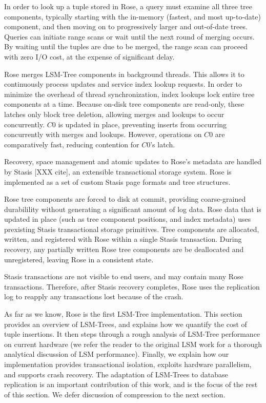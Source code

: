 \documentclass{vldb}
\newcommand{\rows}{Rose\xspace}
\newcommand{\rowss}{Rose's\xspace}
\begin{document}
In order to look up a tuple stored in \rows, a query must examine all
three tree components, typically starting with the in-memory (fastest, and most
up-to-date) component, and then moving on to progressively larger and
out-of-date trees.  Queries can initiate range scans or wait until the next round
of merging occurs.  By waiting until the tuples are due to be merged, the
range scan can proceed with zero I/O cost, at the expense of significant
delay.

\rows merges LSM-Tree components in background threads.  This allows
it to continuously process updates and service index lookup requests.
In order to minimize the overhead of thread synchronization, index
lookups lock entire tree components at a time.  Because on-disk tree
components are read-only, these latches only block tree deletion,
allowing merges and lookups to occur concurrently.  $C0$ is
updated in place, preventing inserts from occurring concurrently with
merges and lookups.  However, operations on $C0$ are comparatively
fast, reducing contention for $C0$'s latch.

Recovery, space management and atomic updates to \rowss metadata are
handled by Stasis [XXX cite], an extensible transactional storage system.  \rows is
implemented as a set of custom Stasis page formats and tree structures.

\rows tree components are forced to disk at commit, providing
coarse-grained durabilility without generating a significant amount of
log data.  \rows data that is updated in place (such as tree component
positions, and index metadata) uses prexisting Stasis transactional
storage primitives.  Tree components are allocated, written, and
registered with \rows within a single Stasis transaction.  During
recovery, any partially written \rows tree components are be
deallocated and unregistered, leaving \rows in a consistent state.

Stasis transactions are not visible to end users, and may contain many
\rows transactions.  Therefore, after Stasis recovery completes, \rows
uses the replication log to reapply any transactions lost because of the
crash.

As far as we know, \rows is the first LSM-Tree implementation.  This
section provides an overview of LSM-Trees, and explains how we
quantify the cost of tuple insertions.  It then steps through a rough
analysis of LSM-Tree performance on current hardware (we refer the
reader to the original LSM work for a thorough analytical discussion
of LSM performance).  Finally, we explain how our implementation
provides transactional isolation, exploits hardware parallelism, and
supports crash recovery.  The adaptation of LSM-Trees to database
replication is an important contribution of this work, and is the
focus of the rest of this section.  We defer discussion of compression
to the next section.
\end{document}
